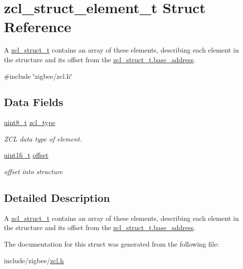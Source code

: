\hypertarget{structzcl__struct__element__t}{\section{zcl\-\_\-struct\-\_\-element\-\_\-t Struct Reference}
\label{structzcl__struct__element__t}
}


A \hyperlink{structzcl__struct__t}{zcl\-\_\-struct\-\_\-t} contains an array of these elements, describing each element in the structure and its offset from the \hyperlink{group__zcl_ga2c4fcaeccedd1b62207f9bb03a26fdf1}{zcl\-\_\-struct\-\_\-t.\-base\-\_\-address}.  




{\ttfamily \#include \char`\"{}zigbee/zcl.\-h\char`\"{}}

\subsection*{Data Fields}
\begin{DoxyCompactItemize}
\item 
\hypertarget{group__zcl_ga6934aa0a5db19737df5eec9c2fdeb997}{\hyperlink{group__hal_gae1affc9ca37cfb624959c866a73f83c2}{uint8\-\_\-t} \hyperlink{group__zcl_ga6934aa0a5db19737df5eec9c2fdeb997}{zcl\-\_\-type}}\label{group__zcl_ga6934aa0a5db19737df5eec9c2fdeb997}

\begin{DoxyCompactList}\small\item\em Z\-C\-L data type of element. \end{DoxyCompactList}\item 
\hypertarget{group__zcl_gac681806181c80437cfab37335f62ff39}{\hyperlink{group__hal_ga5a8b2dc9e45a9ee81a94ef304fb62505}{uint16\-\_\-t} \hyperlink{group__zcl_gac681806181c80437cfab37335f62ff39}{offset}}\label{group__zcl_gac681806181c80437cfab37335f62ff39}

\begin{DoxyCompactList}\small\item\em offset into structure \end{DoxyCompactList}\end{DoxyCompactItemize}


\subsection{Detailed Description}
A \hyperlink{structzcl__struct__t}{zcl\-\_\-struct\-\_\-t} contains an array of these elements, describing each element in the structure and its offset from the \hyperlink{group__zcl_ga2c4fcaeccedd1b62207f9bb03a26fdf1}{zcl\-\_\-struct\-\_\-t.\-base\-\_\-address}. 

The documentation for this struct was generated from the following file\-:\begin{DoxyCompactItemize}
\item 
include/zigbee/\hyperlink{zcl_8h}{zcl.\-h}\end{DoxyCompactItemize}

